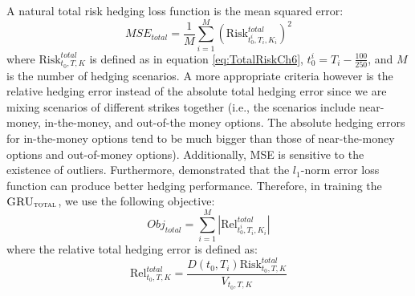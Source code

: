 \documentclass[letterpaper,12pt,titlepage,oneside,final]{book}
\numberwithin{equation}{section}
\theoremstyle{definition}
\newcommand{\model}{\textsc{GRU}_\delta}
\newcommand{\modelT}{\textsc{GRU}_{\textsc{total}}}
\newcommand{\modelL}{\textsc{GRU}_{\textsc{total}}^{\textsc{local}}}
\newcommand{\DS}{\Delta S}
\newcommand{\DT}{\Delta t}
\newcommand{\Smkt}{S}
\begin{document}
A natural total risk hedging loss function is the mean squared error:
\[
MSE_{total}=\frac{1}{M} \sum_{i=1}^M  (\text{Risk}^{total}_{t_0^i,T_i,K_i})^2
\]
where $\text{Risk}^{total}_{t_0,T,K}$ is defined as in equation \eqref{eq:TotalRiskCh6},  $t_0^i=T_i-\frac{100}{250}$, and $M$ is the number of hedging scenarios.
A more appropriate criteria however is the relative hedging error instead of the absolute total hedging error since we are mixing scenarios of different strikes together (i.e., the scenarios include near-money, in-the-money, and out-of-the money options. The absolute hedging errors for in-the-money options tend to be much bigger than those of  near-the-money options and out-of-money options). Additionally, MSE is sensitive to the existence of outliers. Furthermore, \citet{coleman2007total} demonstrated that the  $l_1$-norm error loss function can produce better hedging performance. 
Therefore, in training the $\modelT$, we use the following objective:
\begin{equation}
Obj_{total}=\sum_{i=1}^M \left|\text{Rel}^{total}_{t_0^{i},T_i,K_i}\right|
\label{eq:totalObjLinear}
\end{equation}
where the relative total hedging error is defined as:
\begin{equation}
\text{Rel}^{total}_{t_0,T,K}
=\frac{D(t_0,T_i)  \text{Risk}^{total}_{t_0,T,K}}{V_{t_0,T,K}}
\label{eq:relHError}
\end{equation}


%
%
\end{document}
